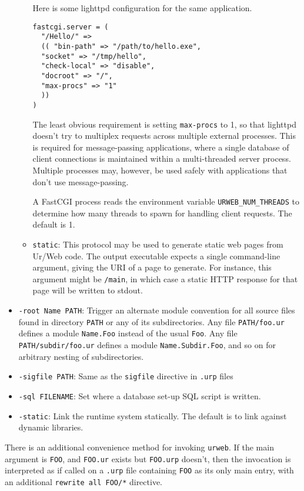 \documentclass{article}
\newcommand{\cd}[1]{\texttt{#1}}
\begin{document}
\begin{itemize}
\begin{itemize}
    Here is some lighttpd configuration for the same application.
    \begin{verbatim}
fastcgi.server = (
  "/Hello/" =>
  (( "bin-path" => "/path/to/hello.exe",
  "socket" => "/tmp/hello",
  "check-local" => "disable",
  "docroot" => "/",
  "max-procs" => "1"
  ))
)
    \end{verbatim}
    The least obvious requirement is setting \texttt{max-procs} to 1, so that lighttpd doesn't try to multiplex requests across multiple external processes.  This is required for message-passing applications, where a single database of client connections is maintained within a multi-threaded server process.  Multiple processes may, however, be used safely with applications that don't use message-passing.

    A FastCGI process reads the environment variable \texttt{URWEB\_NUM\_THREADS} to determine how many threads to spawn for handling client requests.  The default is 1.

  \item \texttt{static}: This protocol may be used to generate static web pages from Ur/Web code.  The output executable expects a single command-line argument, giving the URI of a page to generate.  For instance, this argument might be \cd{/main}, in which case a static HTTP response for that page will be written to stdout.
  \end{itemize}

\item \texttt{-root Name PATH}: Trigger an alternate module convention for all source files found in directory \texttt{PATH} or any of its subdirectories.  Any file \texttt{PATH/foo.ur} defines a module \texttt{Name.Foo} instead of the usual \texttt{Foo}.  Any file \texttt{PATH/subdir/foo.ur} defines a module \texttt{Name.Subdir.Foo}, and so on for arbitrary nesting of subdirectories.

\item \texttt{-sigfile PATH}: Same as the \texttt{sigfile} directive in \texttt{.urp} files

\item \texttt{-sql FILENAME}: Set where a database set-up SQL script is written.

\item \texttt{-static}: Link the runtime system statically.  The default is to link against dynamic libraries.
\end{itemize}

There is an additional convenience method for invoking \texttt{urweb}.  If the main argument is \texttt{FOO}, and \texttt{FOO.ur} exists but \texttt{FOO.urp} doesn't, then the invocation is interpreted as if called on a \texttt{.urp} file containing \texttt{FOO} as its only main entry, with an additional \texttt{rewrite all FOO/*} directive.
\end{document}

